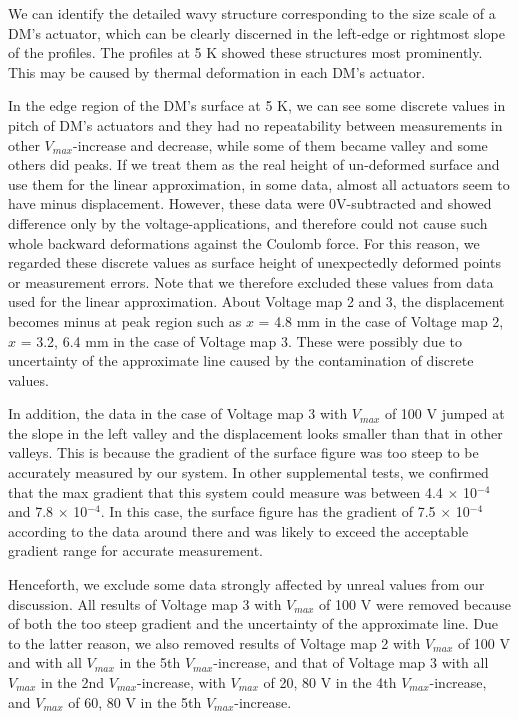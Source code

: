 \documentclass[a4paper]{article}
\begin{document}
We can identify the detailed wavy structure corresponding to the size scale of a DM's actuator, which can be clearly discerned in the left-edge or rightmost slope of the profiles. The profiles at 5 K showed these structures most prominently. This may be caused by thermal deformation in each DM's actuator. 

In the edge region of the DM's surface at 5 K, we can see some discrete values in pitch of DM's actuators and they had no repeatability between measurements in other $V_{max}$-increase and decrease, while some of them became valley and some others did peaks. If we treat them as the real height of un-deformed surface and use them for the linear approximation, in some data, almost all actuators seem to have minus displacement. However, these data were 0V-subtracted and showed difference only by the voltage-applications, and therefore could not cause such whole backward deformations against the Coulomb force. For this reason, we regarded these discrete values as surface height of unexpectedly deformed points or measurement errors. Note that we therefore excluded these values from data used for the linear approximation. About Voltage map 2 and 3, the displacement becomes minus at peak region such as $x$ = 4.8 mm in the case of Voltage map 2, $x$ = 3.2, 6.4 mm in the case of Voltage map 3. These were possibly due to uncertainty of the approximate line caused by the contamination of discrete values.

In addition, the data in the case of Voltage map 3 with $V_{max}$ of 100 V jumped at the slope in the left valley and the displacement looks smaller than that in other valleys. This is because the gradient of the surface figure was too steep to be accurately measured by our system. In other supplemental tests, we confirmed that the max gradient that this system could measure was between 4.4 $\times$ 10$^{-4}$ and 7.8 $\times$ 10$^{-4}$. In this case, the surface figure has the gradient of 7.5 $\times$ 10$^{-4}$ according to the data around there and was likely to exceed the acceptable gradient range for accurate measurement.

Henceforth, we exclude some data strongly affected by unreal values from our discussion. All results of Voltage map 3 with $V_{max}$ of 100 V were removed because of both the too steep gradient and the uncertainty of the approximate line. Due to the latter reason, we also removed results of Voltage map 2 with $V_{max}$ of 100 V and with all $V_{max}$ in the 5th $V_{max}$-increase, and that of Voltage map 3 with all $V_{max}$ in the 2nd $V_{max}$-increase, with $V_{max}$ of 20, 80 V in the 4th $V_{max}$-increase, and $V_{max}$ of 60, 80 V in the 5th $V_{max}$-increase.
\end{document}
